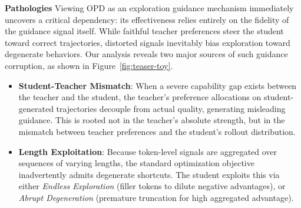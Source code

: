 \documentclass[11pt]{article}
\begin{document}
\vspace{0.1mm}
\noindent \textbf{Pathologies}\quad
Viewing OPD as an exploration guidance mechanism immediately uncovers a critical dependency: its effectiveness relies entirely on the fidelity of the guidance signal itself. 
While faithful teacher preferences steer the student toward correct trajectories, distorted signals inevitably bias exploration toward degenerate behaviors.
Our analysis reveals two major sources of such guidance corruption, as shown in Figure~\ref{fig:teaser-toy}.
\begin{itemize}[leftmargin=*,nosep]
    \item \textbf{Student-Teacher Mismatch}: When a severe capability gap exists between the teacher and the student, the teacher’s preference allocations on student-generated trajectories decouple from actual quality, generating misleading guidance. 
    This is rooted not in the teacher's absolute strength, but in the mismatch between teacher preferences and the student's rollout distribution.
    \item \textbf{Length Exploitation}: Because token-level signals are aggregated over sequences of varying lengths, the standard optimization objective inadvertently admits degenerate shortcuts. 
    The student exploits this via either  \textit{Endless Exploration} (filler tokens to dilute negative advantages), or  \textit{Abrupt Degeneration} (premature truncation for high aggregated advantage).
\end{itemize}

\end{document}
